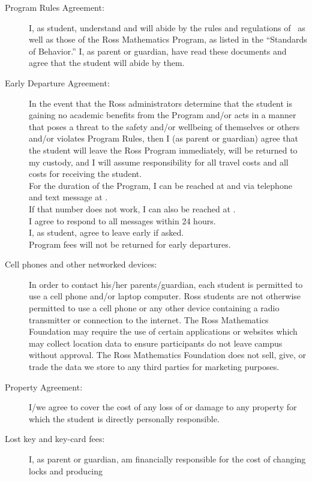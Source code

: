 \documentclass{ross}
\begin{document}
\begin{description}
\item[Program Rules Agreement:] I, as student, understand and will
  abide by the rules and regulations of \campus\ as
  well as those of the Ross Mathematics Program, as listed in the
  ``Standards of Behavior.'' I, as parent or guardian, have read
  these documents and agree that the student will abide by them.
\item[Early Departure Agreement:] In the event that the Ross
  administrators determine that the student is gaining no academic
  benefits from the Program and/or acts in a manner that poses a
  threat to the safety and/or wellbeing of themselves or others and/or
  violates Program Rules, then I (as parent or guardian) agree that
  the student will leave the Ross Program immediately, will be
  returned to my custody, and I will assume responsibility for all
  travel costs and all costs for receiving the student. \\
  For the duration of the Program, I can be reached at
   and via telephone and text message at
  . \\[5pt]
 If that number does not work, I can also be reached at 
  . \\[5pt]
   I agree to respond to all messages within 24 hours. \\[1ex]
I, as student, agree to leave early if asked.  \\
Program fees will not be returned for early departures.
\item[Cell phones and other networked devices:] In order to contact
his/her parents/guardian, each student is permitted to use a cell
phone and/or laptop computer. Ross students are not otherwise
permitted to use a cell phone or any other device containing a radio
transmitter or connection to the internet.  The Ross Mathematics
Foundation may require the use of certain applications or websites
which may collect location data to ensure participants do not leave
campus without approval.  The Ross Mathematics Foundation does not
sell, give, or trade the data we store to any third parties for
marketing purposes.
\item[Property Agreement:] I/we agree to cover the cost of any loss of
  or damage to any property for which the student is directly
  personally responsible.
\item[Lost key and key-card fees:] I, as parent or guardian, am
financially responsible for the cost of changing locks and producing

\end{description}
\end{document}

